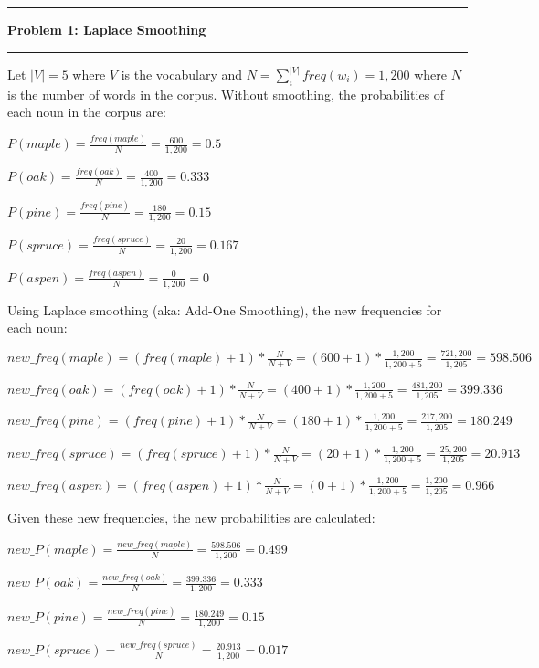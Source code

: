 \documentclass[11pt]{article}
\newcommand\question[2]{\vspace{.25in}\hrule\textbf{#1: #2}\vspace{.5em}\hrule\vspace{.10in}}
\begin{document}
\raggedright

\newcommand\NAME{Jake Pitkin}
\newcommand\UID{u0891770}
\newcommand\HWNUM{2}

\question{Problem 1}{Laplace Smoothing}

Let $|V| = 5$ where $V$ is the vocabulary and  $N = \sum\limits_{i}^{|V|} freq(w_i) = 1,200$ where $N$ is the number of words in the corpus. Without smoothing, the probabilities of each noun in the corpus are:

\qquad$P(maple) = \frac{freq(maple)}{N} = \frac{600}{1,200} = 0.5$

\qquad$P(oak) = \frac{freq(oak)}{N} = \frac{400}{1,200} = 0.333$

\qquad$P(pine) = \frac{freq(pine)}{N} = \frac{180}{1,200} = 0.15$

\qquad$P(spruce) = \frac{freq(spruce)}{N} = \frac{20}{1,200} = 0.167$

\qquad$P(aspen) = \frac{freq(aspen)}{N} = \frac{0}{1,200} = 0$

Using Laplace smoothing (aka: Add-One Smoothing), the new frequencies for each noun:

\qquad$new\_freq(maple) = (freq(maple) + 1) * \frac{N}{N + V} = (600 + 1) * \frac{1,200}{1,200 + 5} = \frac{721,200}{1,205} = 598.506$

\qquad$new\_freq(oak) = (freq(oak) + 1) * \frac{N}{N + V} = (400 + 1) * \frac{1,200}{1,200 + 5} = \frac{481,200}{1,205} = 399.336$

\qquad$new\_freq(pine) = (freq(pine) + 1) * \frac{N}{N + V} = (180 + 1) * \frac{1,200}{1,200 + 5} = \frac{217,200}{1,205} = 180.249$

\qquad$new\_freq(spruce) = (freq(spruce) + 1) * \frac{N}{N + V} = (20 + 1) * \frac{1,200}{1,200 + 5} = \frac{25,200}{1,205} = 20.913$

\qquad$new\_freq(aspen) = (freq(aspen) + 1) * \frac{N}{N + V} = (0 + 1) * \frac{1,200}{1,200 + 5} = \frac{1,200}{1,205} = 0.966$

Given these new frequencies, the new probabilities are calculated:

\qquad$new\_P(maple) = \frac{new\_freq(maple)}{N} = \frac{598.506}{1,200} = 0.499$

\qquad$new\_P(oak) = \frac{new\_freq(oak)}{N} = \frac{399.336}{1,200} = 0.333$

\qquad$new\_P(pine) = \frac{new\_freq(pine)}{N} = \frac{180.249}{1,200} = 0.15$

\qquad$new\_P(spruce) = \frac{new\_freq(spruce)}{N} = \frac{20.913}{1,200} = 0.017$
\end{document}
